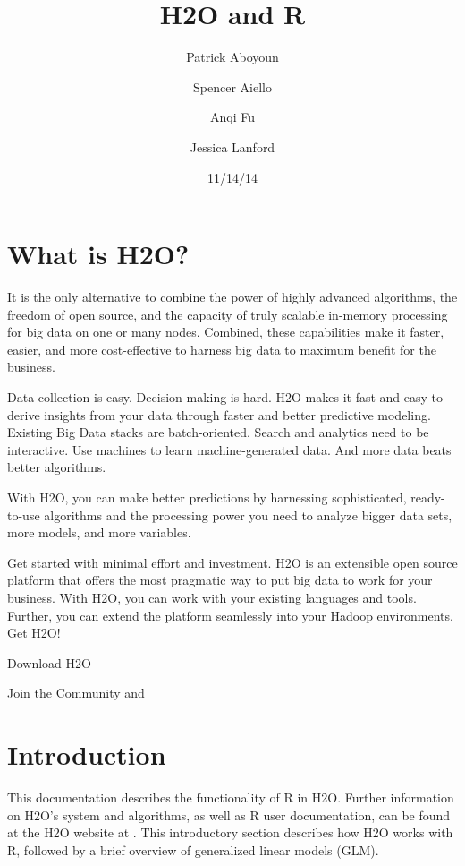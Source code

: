 \documentclass[11pt]{article}
\begin{document}
\title{H2O and R}
\author{Patrick Aboyoun}
\author{Spencer Aiello}
\author{Anqi Fu}
\author{Jessica Lanford}
\date{11/14/14}
\maketitle



\section{What is H2O?}

It is the only alternative to combine the power of highly advanced algorithms, the freedom of open source, and the capacity of truly scalable in-memory processing for big data on one or many nodes. Combined, these capabilities make it faster, easier, and more cost-effective to harness big data to maximum benefit for the business. 

Data collection is easy. Decision making is hard. H2O makes it fast and easy to derive insights from your data through faster and better predictive modeling. Existing Big Data stacks are batch-oriented. Search and analytics need to be interactive. Use machines to learn machine-generated data. And more data beats better algorithms. 

With H2O, you can make better predictions by harnessing sophisticated, ready-to-use algorithms and the processing power you need to analyze bigger data sets, more models, and more variables. 

Get started with minimal effort and investment. H2O is an extensible open source platform that offers the most pragmatic way to put big data to work for your business. With H2O, you can work with your existing languages and tools. Further, you can extend the platform seamlessly into your Hadoop environments. Get H2O!

Download H2O

Join the Community
 and 

\section{Introduction}

This documentation describes the functionality of R in H2O. Further information on H2O's system and algorithms, as well as R user documentation, can be found at the H2O website at . This introductory section describes how H2O works with R, followed by a brief overview of generalized linear models (GLM). 
\end{document}
